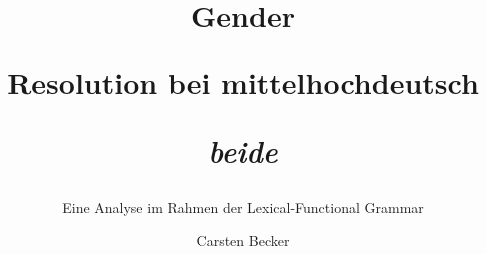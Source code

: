 \author{Carsten Becker}
\title{Gender\strut{} Resolution bei mittelhochdeutsch\strut{} \emph{beide}}
\subtitle{Eine Analyse im Rahmen der Lexical-Functional Grammar}
\renewcommand{\lsSeries}{ahl}
\renewcommand{\lsSeriesNumber}{1}%
\lsCoverTitleSizes{42pt}{16.25pt}%


